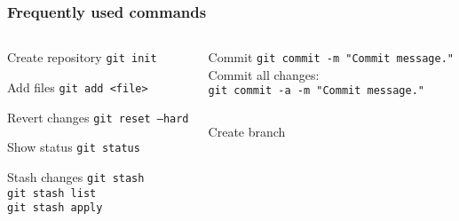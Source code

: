 \documentclass{beamer}
\begin{document}
\begin{frame}[t,squeeze]
    \frametitle{Frequently used commands}
    \vspace{-7mm}
        \small
        \begin{columns}[T]
            \begin{column}{.33\linewidth}
                \begin{block}{Create repository}
                        \texttt{git init}
                \end{block}
                \vspace{-1.2mm}
                \begin{block}{Add files}
                        \texttt{git add <file>}
                \end{block}
                \vspace{-1.2mm}
                \begin{block}{Revert changes}
                        \texttt{git reset ---hard}
                \end{block}
                \vspace{-1.2mm}
                \begin{block}{Show status}
                        \texttt{git status}
                \end{block}
                \vspace{-1.2mm}
                \begin{block}{Stash changes}
                        \texttt{git stash}\\
                        \texttt{git stash list}\\
                        \texttt{git stash apply}
                \end{block}
            \end{column}
            \begin{column}{.66\linewidth}
                \begin{block}{Commit}
                        \texttt{git commit -m "Commit message."}\\
                        Commit all changes:\\
                        \texttt{git commit -a -m "Commit message."}
                \end{block}
                \vspace{-2mm}
                \begin{columns}
                    \begin{column}{.45\linewidth}
                        \begin{block}{Create branch}

\end{block}
\end{column}
\end{columns}
\end{column}
\end{columns}
\end{frame}
\end{document}
